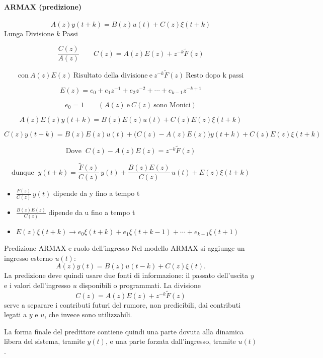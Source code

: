 \documentclass[11pt,a4paper]{article}
\begin{document}
\paragraph{ARMAX (predizione)}
\[
A(z)y(t+k) = B(z)u(t)+C(z)\xi(t+k)
\]
Lunga Divisione $k$ Passi

\[
\frac{C(z)}{A(z)} \qquad C(z)=A(z)E(z)+z^{-k}\tilde F(z)
\]

\[
\text{con} \ A(z)E(z) \ \text{Risultato della divisione} \ \text{e} \ z^{-k}\tilde F(z) \ \text{Resto dopo k passi}
\]

\[
E(z)=e_0+e_1z^{-1}+e_2z^{-2}+\cdots+e_{k-1}z^{-k+1}
\]

\[
e_0=1 \qquad (A(z)\ \text{e}\ C(z)\ \text{sono Monici})
\]

\[
A(z)E(z)y(t+k)=B(z)E(z)u(t)+C(z)E(z)\xi(t+k)
\]

\[
C(z)y(t+k)=B(z)E(z)u(t)+\bigl(C(z)-A(z)E(z)\bigr)y(t+k)+ C(z)E(z)\xi(t+k)
\]

\[
\text{Dove } \ C(z)-A(z)E(z) = z^{-k}\tilde F(z)
\]

\[
\text{dunque } \ y(t+k)=\frac{\tilde F(z)}{C(z)}\,y(t)+\frac{B(z)E(z)}{C(z)}\,u(t)+E(z)\xi(t+k)
\]

\begin{itemize}
    \item $\frac{F(z)}{C(z)}\,y(t)$ dipende da y fino a tempo t
    \item $\frac{B(z)E(z)}{C(z)}$ dipende da u fino a tempo t
    \item $E(z)\xi(t+k) \rightarrow e_0\xi(t+k)+e_1\xi(t+k-1)+\cdots+e_{k-1}\xi(t+1)$
\end{itemize}

\begin{spiegazione}{Predizione ARMAX e ruolo dell'ingresso}
Nel modello ARMAX si aggiunge un ingresso esterno $u(t)$:
\[
A(z)y(t)=B(z)u(t-k)+C(z)\xi(t).
\]
La predizione deve quindi usare due fonti di informazione: il passato dell'uscita $y$ e i valori dell'ingresso $u$ disponibili o programmati. La divisione
\[
C(z)=A(z)E(z)+z^{-k}\tilde F(z)
\]
serve a separare i contributi futuri del rumore, non predicibili, dai contributi legati a $y$ e $u$, che invece sono utilizzabili.

La forma finale del predittore contiene quindi una parte dovuta alla dinamica libera del sistema, tramite $y(t)$, e una parte forzata dall'ingresso, tramite $u(t)$.
\end{spiegazione}
\end{document}
